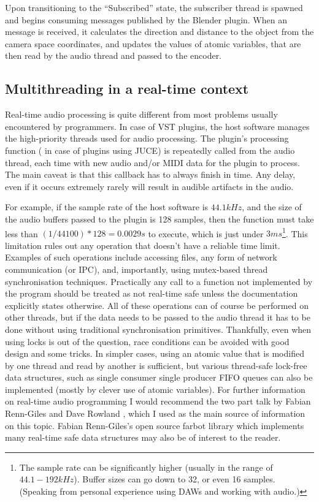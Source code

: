 Upon transitioning to the ``Subscribed'' state, the subscriber thread is spawned and begins consuming messages published by the Blender plugin.
When an  message is received, it calculates the direction and distance to the object from the camera space coordinates, 
and updates the values of atomic variables, that are then read by the audio thread and passed to the encoder. 

\subsection{Multithreading in a real-time context}
Real-time audio processing is quite different from most problems usually encountered by programmers.
In case of VST plugins, the host software manages the high-priority threads used for audio processing.
The plugin's processing function ( in case of plugins using JUCE) is repeatedly called from the audio thread,
each time with new audio and/or MIDI data for the plugin to process. \cite{juce_audioprocessor_doc}
The main caveat is that this callback has to always finish in time. Any delay, even if it occurs extremely rarely
will result in audible artifacts in the audio. \cite{rt_101_talk_part_1}\cite{locks_in_real_time_blog_post}

For example, if the sample rate of the host software is $44.1kHz$, and the size of the audio buffers passed to the plugin is 128 samples,
then the  function must take less than $(1/44100)*128 = 0.0029s$ to execute, which is just under $3ms$\footnote{
    The sample rate can be significantly higher (usually in the range of $44.1-192 kHz$). Buffer sizes can go down to 32, or even 16 samples. (Speaking from personal experience using DAWs and working with audio.)
}. \cite{locks_in_real_time_blog_post}
This limitation rules out any operation that doesn't have a reliable time limit.
Examples of such operations include accessing files, any form of network communication (or IPC), and, importantly,
using mutex-based thread synchronisation techniques.
Practically any call to a function not implemented by the program should be treated as not real-time safe
unless the documentation explicitly states otherwise. \cite{rt_101_talk_part_1} 
All of these operations can of course be performed on other threads, but if the data needs to be passed to the audio thread
it has to be done without using traditional synchronisation primitives.
Thankfully, even when using locks is out of the question, race conditions can be avoided with good design and some tricks.
In simpler cases, using an atomic value that is modified by one thread and read by another is sufficient, 
but various thread-safe lock-free data structures, such as single consumer single producer FIFO queues can also be implemented (mostly by clever use of atomic variables).
For further information on real-time audio programming I would recommend the two part talk by Fabian Renn-Giles and Dave Rowland \cite{rt_101_talk_part_1}\cite{rt_101_talk_part_2},
which I used as the main source of information on this topic.
Fabian Renn-Giles's open source farbot library \cite{farbot_repo} which implements many real-time safe data structures may also be of interest to the reader.

